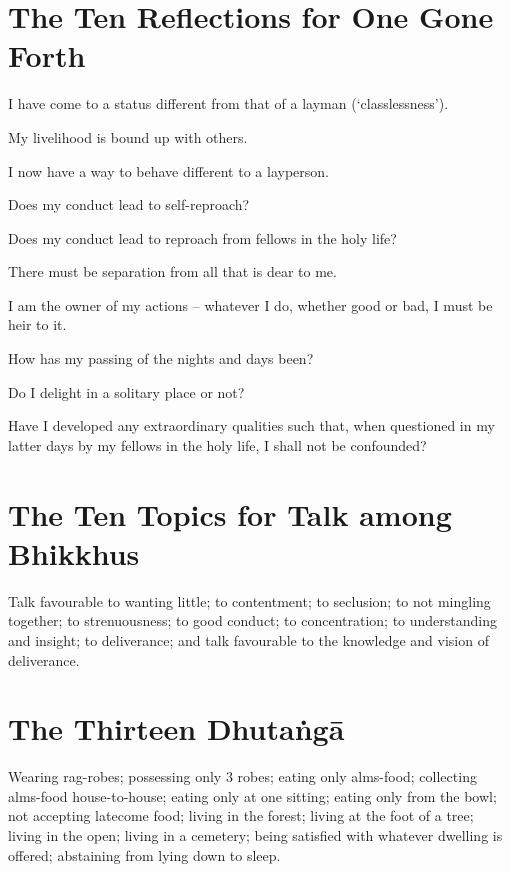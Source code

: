 \vspace*{-\baselineskip}

\section*{The Ten Reflections for One Gone Forth}

I have come to a status different from that of a layman (‘classlessness’).

My livelihood is bound up with others.

I now have a way to behave different to a layperson.

Does my conduct lead to self-reproach?

Does my conduct lead to reproach from fellows in the holy life?

There must be separation from all that is dear
to me.

I am the owner of my actions -- whatever I do, whether good or bad, I must be
heir to it.

How has my passing of the nights and days been?

Do I delight in a solitary place or not?

Have I developed any extraordinary qualities such that, when questioned in my
latter days by my fellows in the holy life, I shall not be confounded?\\
\mbox{}

\vspace*{-\baselineskip}

\section*{The Ten Topics for Talk among Bhikkhus}

Talk favourable to wanting little; to contentment; to seclusion; to not mingling
together; to strenuousness; to good conduct; to concentration; to understanding
and insight; to deliverance; and talk favourable to the knowledge and vision of
deliverance.\\
\mbox{}

\vspace*{-\baselineskip}

\section*{The Thirteen Dhutaṅgā}

Wearing rag-robes; possessing only 3 robes; eating only alms-food; collecting
alms-food house-to-house; eating only at one sitting; eating only from the bowl;
not accepting latecome food; living in the forest; living at the foot of a tree;
living in the open; living in a cemetery; being satisfied with whatever dwelling
is offered; abstaining from lying down to sleep.\\
\mbox{}

